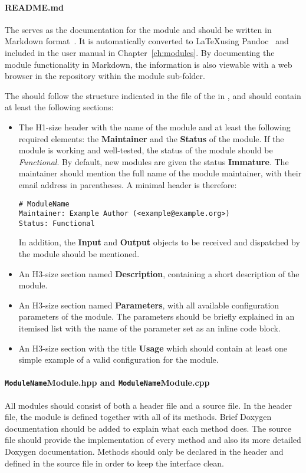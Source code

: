 \paragraph{README.md}
The  serves as the documentation for the module and should be written in Markdown format~\cite{markdown}.
It is automatically converted to \LaTeX using Pandoc~\cite{pandoc} and included in the user manual in Chapter~\ref{ch:modules}.
By documenting the module functionality in Markdown, the information is also viewable with a web browser in the repository within the module sub-folder.

The  should follow the structure indicated in the  file of the  in , and should contain at least the following sections:
\begin{itemize}
\item The H1-size header with the name of the module and at least the following required elements: the \textbf{Maintainer} and the \textbf{Status} of the module.
If the module is working and well-tested, the status of the module should be \textit{Functional}.
By default, new modules are given the status \textbf{Immature}.
The maintainer should mention the full name of the module maintainer, with their email address in parentheses.
A minimal header is therefore:
\begin{verbatim}
# ModuleName
Maintainer: Example Author (<example@example.org>)
Status: Functional
\end{verbatim}
In addition, the \textbf{Input} and \textbf{Output} objects to be received and dispatched by the module should be mentioned.
\item An H3-size section named \textbf{Description}, containing a short description of the module.
\item An H3-size section named \textbf{Parameters}, with all available configuration parameters of the module.
The parameters should be briefly explained in an itemised list with the name of the parameter set as an inline code block.
\item An H3-size section with the title \textbf{Usage} which should contain at least one simple example of a valid configuration for the module.
\end{itemize}

\paragraph{\texttt{ModuleName}Module.hpp and \texttt{ModuleName}Module.cpp}
All modules should consist of both a header file and a source file.
In the header file, the module is defined together with all of its methods.
Brief Doxygen documentation should be added to explain what each method does.
The source file should provide the implementation of every method and also its more detailed Doxygen documentation.
Methods should only be declared in the header and defined in the source file in order to keep the interface clean.

